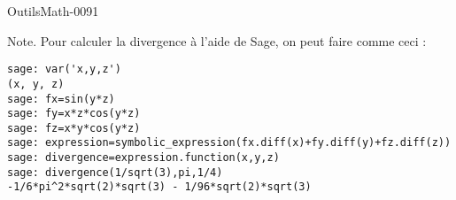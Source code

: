 \begin{corrige}{OutilsMath-0091}
\begin{enumerate}
    \end{enumerate}
    
    Note. Pour calculer la divergence à l'aide de Sage, on peut faire comme ceci :
    \begin{verbatim}
sage: var('x,y,z')
(x, y, z)
sage: fx=sin(y*z)
sage: fy=x*z*cos(y*z)
sage: fz=x*y*cos(y*z)
sage: expression=symbolic_expression(fx.diff(x)+fy.diff(y)+fz.diff(z))
sage: divergence=expression.function(x,y,z)
sage: divergence(1/sqrt(3),pi,1/4)
-1/6*pi^2*sqrt(2)*sqrt(3) - 1/96*sqrt(2)*sqrt(3)
    \end{verbatim}

\end{corrige}
